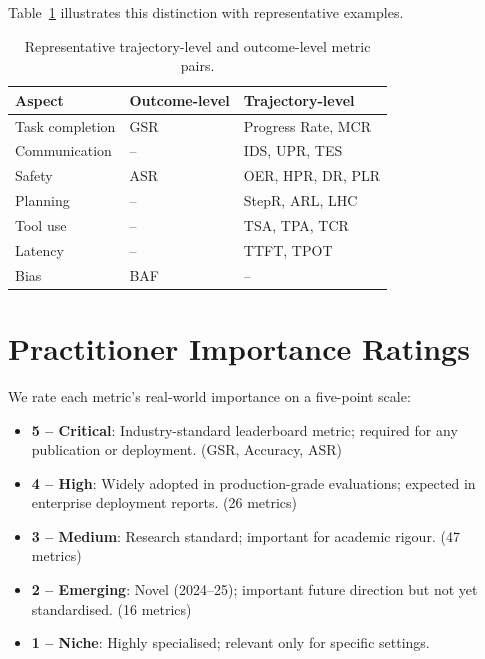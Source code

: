 \documentclass[11pt,a4paper]{article}
\begin{document}
Table~\ref{tab:trajectory_examples} illustrates this distinction with representative
examples.

\begin{table}[h!]
  \centering
  \caption{Representative trajectory-level and outcome-level metric pairs.}
  \label{tab:trajectory_examples}
  \begin{tabular}{lll}
    \toprule
    \textbf{Aspect} & \textbf{Outcome-level} & \textbf{Trajectory-level} \\
    \midrule
    Task completion   & GSR                & Progress Rate, MCR     \\
    Communication     & --                 & IDS, UPR, TES          \\
    Safety            & ASR                & OER, HPR, DR, PLR      \\
    Planning          & --                 & StepR, ARL, LHC        \\
    Tool use          & --                 & TSA, TPA, TCR          \\
    Latency           & --                 & TTFT, TPOT             \\
    Bias              & BAF                & --                     \\
    \bottomrule
  \end{tabular}
\end{table}

\section{Practitioner Importance Ratings}
\label{sec:importance}

We rate each metric's real-world importance on a five-point scale:

\begin{itemize}
  \item \textbf{5 -- Critical}: Industry-standard leaderboard metric; required for
    any publication or deployment. (GSR, Accuracy, ASR)
  \item \textbf{4 -- High}: Widely adopted in production-grade evaluations;
    expected in enterprise deployment reports. (26 metrics)
  \item \textbf{3 -- Medium}: Research standard; important for academic rigour.
    (47 metrics)
  \item \textbf{2 -- Emerging}: Novel (2024--25); important future direction but
    not yet standardised. (16 metrics)
  \item \textbf{1 -- Niche}: Highly specialised; relevant only for specific settings.
\end{itemize}
\end{document}
